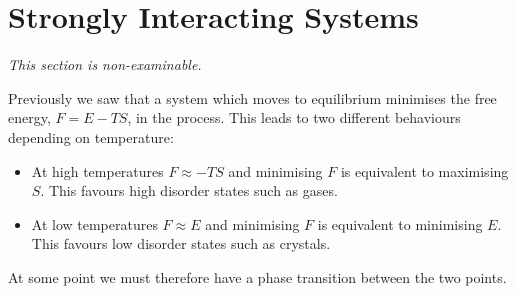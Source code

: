 \documentclass[a4paper]{article}
\begin{document}
    \section{Strongly Interacting Systems}
    \textit{This section is non-examinable.}
    
    Previously we saw that a system which moves to equilibrium minimises the free energy, \(F = E - TS\), in the process.
    This leads to two different behaviours depending on temperature:
    \begin{itemize}
        \item At high temperatures \(F \approx -TS\) and minimising \(F\) is equivalent to maximising \(S\).
        This favours high disorder states such as gases.
        \item At low temperatures \(F\approx E\) and minimising \(F\) is equivalent to minimising \(E\).
        This favours low disorder states such as crystals.
    \end{itemize}
    At some point we must therefore have a phase transition between the two points.
\end{document}
